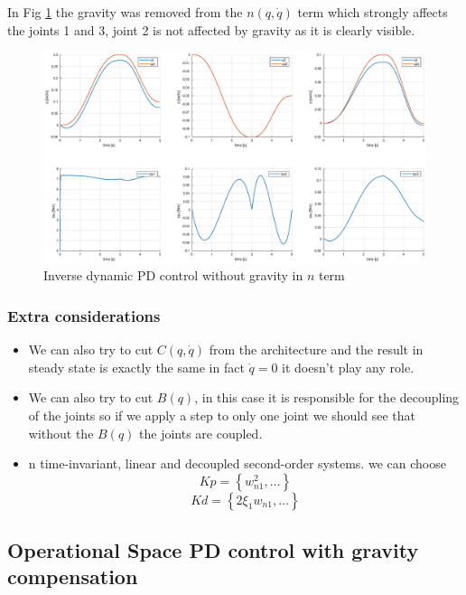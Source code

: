 \documentclass[a4paper,12pt]{article}
\begin{document}
In Fig \ref{fig:inv_dyn_no_grav} the gravity was removed from the $n(q,\dot{q})$ term which strongly affects the joints 1 and 3, joint 2 is not affected by gravity as it is clearly visible.

\begin{figure}[H]
    \begin{center}
        \hspace*{-4.5cm}
        \includegraphics[scale=0.5]{images/inv_dyn_no_grav.eps}
    \end{center}
    \caption{Inverse dynamic PD control without gravity in $n$ term}
    \label{fig:inv_dyn_no_grav}
\end{figure}

\subsubsection{Extra considerations}

\begin{itemize}
\item We can also try to cut $C(q,\dot{q})$ from the architecture and the result in steady state is exactly the same in fact $\dot{q} = 0 $ it doesn't play any role. 

\item We can also try to cut $B(q)$, in this case it is responsible for the decoupling of the joints so if we apply a step to only one joint we should see that without the $B(q)$ the joints are coupled.

\item n time-invariant, linear and decoupled second-order systems. we can choose \[ Kp =  \left \{ w_{n1}^2 , \dots \right \} \] \[ Kd = \left \{2\xi_1 w_{n1}, \dots \right \} \]
\end{itemize}

\newpage
\subsection{Operational Space PD control with gravity compensation}
\end{document}
